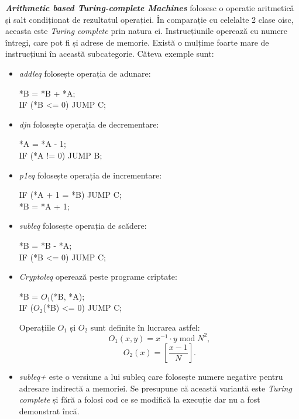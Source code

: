\documentclass[../main.tex]{subfiles}
\begin{document}
\emph{\textbf{Arithmetic based Turing-complete Machines}} folosesc o operatie aritmetică și salt condiționat de rezultatul operației.
În comparație cu celelalte 2 clase \acrshort{oisc}, aceasta este \emph{Turing complete} prin natura ei. Instrucțiunile operează
cu numere întregi, care pot fi și adrese de memorie. Există o mulțime foarte mare de instrucțiuni în această subcategorie. Căteva exemple sunt:
\begin{itemize}
    \item \emph{\acrshort{addleq}} \cite{addleq} folosește operația de adunare:
    \begin{center}\ttfamily
        *B = *B + *A;\\
        IF (*B <= 0) JUMP C;
    \end{center}
    \item \emph{\acrshort{djn}} \cite{djn} folosește operația de decrementare:
    \begin{center}\ttfamily
        *A = *A - 1;\\
        IF (*A != 0) JUMP B;
    \end{center}
    \item \emph{\acrshort{p1eq}} \cite{p1eq} folosește operația de incrementare:
    \begin{center}\ttfamily
        IF (*A + 1 = *B) JUMP C;\\
        *B = *A + 1;
    \end{center}
    \item \emph{\acrshort{subleq}} \cite{subleq} folosește operația de scădere:
    \begin{center}\ttfamily
        *B = *B - *A;\\
        IF (*B <= 0) JUMP C;
    \end{center}
    \item \emph{Cryptoleq} \cite{cryptoleq} operează peste programe criptate:
    \begin{center}\ttfamily
        *B = $O_{1}$(*B, *A);\\
        IF ($O_{2}$(*B) <= 0) JUMP C;
    \end{center}
    Operațiile $O_{1}$ și $O_{2}$ sunt definite în lucrarea \cite{encript_comp} astfel:
    \begin{equation*}
        O_{1}(x, y) = x^{-1} \cdot y\;\mathrm{mod}\; N^{2},
    \end{equation*}
    \begin{equation*}
        O_{2}(x) = \left[\frac{x-1}{N}\right].
    \end{equation*}
    \item \emph{\acrshort{subleq}+} este o versiune a lui \acrshort{subleq} \cite{subleq} care folosește numere
    negative pentru adresare indirectă a memoriei. Se presupune că această variantă este \emph{Turing complete} și fără
    a folosi cod ce se modifică la execuție dar nu a fost demonstrat încă.
\end{itemize}
\end{document}
